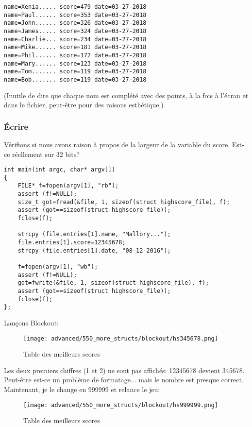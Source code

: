 \begin{lstlisting}
name=Xenia..... score=479 date=03-27-2018
name=Paul...... score=353 date=03-27-2018
name=John...... score=326 date=03-27-2018
name=James..... score=324 date=03-27-2018
name=Charlie... score=234 date=03-27-2018
name=Mike...... score=181 date=03-27-2018
name=Phil...... score=172 date=03-27-2018
name=Mary...... score=123 date=03-27-2018
name=Tom....... score=119 date=03-27-2018
name=Bob....... score=119 date=03-27-2018
\end{lstlisting}

(Inutile de dire que chaque nom est complété avec des points, à la fois à l'écran
et dans le fichier, peut-être pour des raisons esthétique.)

\subsubsection{Écrire}

Vérifions si nous avons raison à propos de la largeur de la variable du score. Est-ce
réellement sur 32 bits?

\begin{lstlisting}[style=customc]
int main(int argc, char* argv[])
{
	FILE* f=fopen(argv[1], "rb");
	assert (f!=NULL);
	size_t got=fread(&file, 1, sizeof(struct highscore_file), f);
	assert (got==sizeof(struct highscore_file));
	fclose(f);

	strcpy (file.entries[1].name, "Mallory...");
	file.entries[1].score=12345678;
	strcpy (file.entries[1].date, "08-12-2016");

	f=fopen(argv[1], "wb");
	assert (f!=NULL);
	got=fwrite(&file, 1, sizeof(struct highscore_file), f);
	assert (got==sizeof(struct highscore_file));
	fclose(f);
};
\end{lstlisting}

Lançons Blockout:

\begin{figure}[H]
\centering
\texttt{[image: advanced/550\_more\_structs/blockout/hs345678.png]}
\caption{Table des meilleurs scores}
\end{figure}

Les deux premiers chiffres (1 et 2) ne sont pas affichés: 12345678 devient 345678.
Peut-être est-ce un problème de formatage... mais le nombre est presque correct.
Maintenant, je le change en 999999 et relance le jeu:

\begin{figure}[H]
\centering
\texttt{[image: advanced/550\_more\_structs/blockout/hs999999.png]}
\caption{Table des meilleurs scores}
\end{figure}

